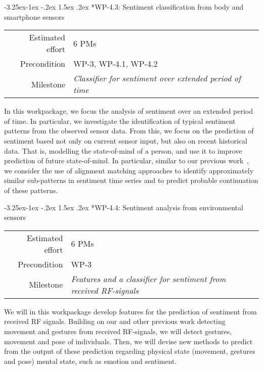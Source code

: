 \documentclass[12pt]{article}
\makeatletter
\newcommand{\kobyc}[1]{\begin{center}\fbox{\parbox{3in}{{\textcolor{green}{K: #1}}}}\end{center}}
\renewcommand\paragraph{\@startsection{paragraph}{4}{\z@}%
  {-3.25ex\@plus -1ex \@minus -.2ex}%
  {1.5ex \@plus .2ex}%
  {\normalfont\normalsize\bfseries}}
\makeatother
\begin{document}
\paragraph*{WP-4.3: Sentiment classification from body and smartphone sensors}
\begin{tabular}{rl}
	Estimated effort& 6 PMs\\
	Precondition & WP-3, WP-4.1, WP-4.2\\
	Milestone & \begin{minipage}[t]{12.2cm}
		\textit{Classifier for sentiment over extended period of time}\vspace{.2cm}
	\end{minipage}
\end{tabular}

\noindent
In this workpackage, we focus the analysis of sentiment over an extended period of time. 
In particular, we investigate the identification of typical sentiment patterns from the observed sensor data.
From this, we focus on the prediction of sentiment based not only on current sensor input, but also on recent historical data. 
That is, modelling the state-of-mind of a person, and use it to improve prediction of future state-of-mind. 
In particular, similar to our previous work~\cite{4026,4027}, we consider the use of alignment matching approaches to identify approximately similar sub-patterns in sentiment time series and to predict probable continuation of these patterns.


\paragraph*{WP-4.4: Sentiment analysis from environmental sensors}
\begin{tabular}{rl}
	Estimated effort& 6 PMs\\
	Precondition & WP-3\\
	Milestone & \begin{minipage}[t]{12.2cm}
		\textit{Features and a classifier for sentiment from received RF-signals}\vspace{.2cm}
	\end{minipage}
\end{tabular}

\noindent
We will in this workpackage develop features for the prediction of sentiment from received RF signals. 
Building on our and other previous work detecting movement and gestures from received RF-signals, we will detect gestures, movement and pose of individuals. 
Then, we will devise new methods to predict from the output of these prediction regarding physical state (movement, gestures and pose) mental state, such as emotion and sentiment. 
\end{document}
